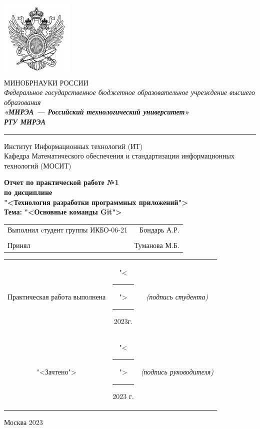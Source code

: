 \begin{center}
	\includegraphics[scale=0.5]{./res/logo.png}\\
	\normalsize{МИНОБРНАУКИ РОССИИ}\\
	\normalsize{\itshape Федеральное государственное бюджетное образовательное учреждение высшего образования}\\
	\normalsize{\bfseries\itshape«МИРЭА --- Российский технологический университет»}\\
	\large{\bfseries\itshape РТУ МИРЭА}\\
	\bigskip \hrule \smallskip
	\normalsize{Институт Информационных технологий (ИТ)}\\
	\vfill
	\normalsize{Кафедра Математического обеспечения и стандартизации информационных технологий (МОСИТ)}\\
	\vfill
	\begin{normalsize}
	  \textbf{
	    Отчет по практической работе №1\\
	    по дисциплине\\
	    "<Технология разработки программных приложений">\\
	    Тема: "<Основные команды Git">\\
	  }
	\end{normalsize}
	\vfill
	\vfill
	\begin{small}
		\begin{tabular}{lr}
			Выполнил cтудент группы ИКБО-06-21 & Бондарь А.Р.\\\\
			Принял & Туманова М.Б.\\
		\end{tabular}
	\end{small}
	\vfill
	\begin{footnotesize}
		\begin{tabular}{ccc}
			Практическая  работа выполнена
			& "<\rule{1ex}{.5pt}">\rule{7ex}{.5pt}2023г.
			& \textit{(подпись студента)}\\
			"<Зачтено"> 
			& "<\rule{1ex}{.5pt}">\rule{7ex}{.5pt}2023 г.
			& \textit{(подпись руководителя)}\\
		\end{tabular}
	\end{footnotesize}
	\vfill
\end{center}

\begin{center} Москва 2023 \end{center}

\thispagestyle{empty}
